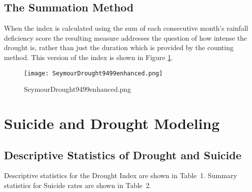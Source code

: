\documentclass[a4paper]{article}                %
\begin{document}



        \subsection{The Summation Method}
        When the index is calculated using the sum of each consecutive month's rainfall deficiency score the resulting measure addresses  the question of how intense the drought is, rather than just the duration which is provided by the counting method.  This version  of the index is shown in Figure \ref{fig:SeymourDrought9499enhanced.png}.


        \begin{figure}[!h]
        \centering
        \texttt{[image: SeymourDrought9499enhanced.png]}
        \caption{SeymourDrought9499enhanced.png}
        \label{fig:SeymourDrought9499enhanced.png}
        \end{figure}



\section{Suicide and Drought Modeling}







\subsection{Descriptive Statistics of Drought and Suicide}
Descriptive statistics for the Drought Index are shown in Table~1.  Summary statistics for Suicide rates are shown in Table~2.
\end{document}
